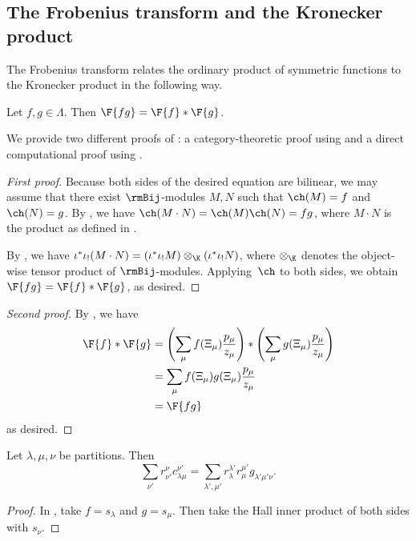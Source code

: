 \subsection{The Frobenius transform and the Kronecker product}
The Frobenius transform relates the ordinary product of symmetric functions to the Kronecker product in the following way.
\begin{prop}[{cf. \cite[Section~2.3]{MR4275829}}]
\label{proposition:kronecker}
Let $f, g \in \Lambda$. Then $\F{fg} = \F{f} \ast \F{g}$.
\end{prop}
We provide two different proofs of : a category-theoretic proof using  and a direct computational proof using .
\begin{proof}[First proof]
    Because both sides of the desired equation are bilinear, we may assume that there exist $\rmBij$-modules $M, N$ such that $\ch(M) = f$ and $\ch(N) = g$. By , we have $\ch(M \cdot N) = \ch(M) \ch(N) = fg$, where $M \cdot N$ is the product as defined in .
    
    By \cite[Equation~2.1(ii)]{MR0927763}, we have $\iota^* \iota_! (M \cdot N) = (\iota^* \iota_! M) \otimes_{\K} (\iota^* \iota_! N)$, where $\otimes_\K$ denotes the object-wise tensor product of $\rmBij$-modules. Applying~$\ch$ to both sides, we obtain $\F{fg} = \F{f} \ast \F{g}$, as desired.
\end{proof}
\begin{proof}[Second proof]
By , we have
\begin{align*}
    \F{f} \ast \F{g} &= \left(\sum_{\mu} f(\Xi_\mu) \frac{p_\mu}{z_\mu}\right) \ast \left(\sum_{\mu} g(\Xi_\mu) \frac{p_\mu}{z_\mu}\right) \\
    &= \sum_{\mu} f(\Xi_\mu)g(\Xi_\mu) \frac{p_\mu}{z_\mu} \\
    &= \F{fg}
\end{align*}
as desired.
\end{proof}

\begin{coro}
\label{corollary:productcoefficients}
Let $\lambda, \mu, \nu$ be partitions. Then
\[\sum_{\nu'} r^{\nu}_{\nu'} c^{\nu'}_{\lambda\mu} = \sum_{\lambda', \mu'} r^{\lambda'}_{\lambda} r^{\mu'}_{\mu} g_{\lambda'\mu'\nu}.\]
\end{coro}
\begin{proof}
In , take $f = s_\lambda$ and $g = s_\mu$. Then take the Hall inner product of both sides with $s_\nu$.
\end{proof}

